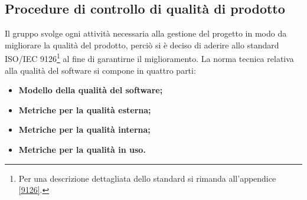\subsection{Procedure di controllo di qualità di prodotto}
Il gruppo svolge ogni attività necessaria alla gestione del progetto in modo da migliorare la qualità del prodotto, perciò si è deciso di aderire allo standard ISO/IEC 9126\footnote{Per una descrizione dettagliata dello standard si rimanda all'appendice \ref{9126}.} al fine di garantirne il miglioramento. La norma tecnica relativa alla qualità del software si compone in quattro parti:
\begin{itemize}
	\item \textbf{Modello della qualità del software;}
	\item \textbf{Metriche per la qualità esterna;}
	\item \textbf{Metriche per la qualità interna;}
	\item \textbf{Metriche per la qualità in uso.}
\end{itemize}

